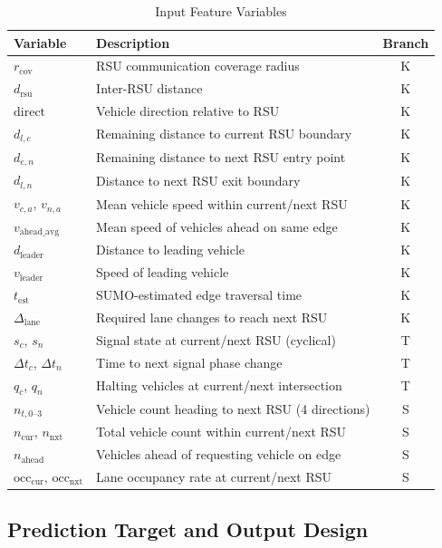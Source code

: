 \documentclass[journal]{IEEEtran}
\begin{document}
\begin{table}[!t]
\centering
\caption{Input Feature Variables}
\label{tab:features}
\begin{tabular}{|l|L{3.8cm}|c|}
\hline
\textbf{Variable} & \textbf{Description} & \textbf{Branch} \\
\hline\hline
$r_\text{cov}$ & RSU communication coverage radius & K \\
$d_\text{rsu}$ & Inter-RSU distance & K \\
$\text{direct}$ & Vehicle direction relative to RSU & K \\
$d_{l,c}$ & Remaining distance to current RSU boundary & K \\
$d_{e,n}$ & Remaining distance to next RSU entry point & K \\
$d_{l,n}$ & Distance to next RSU exit boundary & K \\
$v_{c,a}$, $v_{n,a}$ & Mean vehicle speed within current/next RSU & K \\
$v_\text{ahead\_avg}$ & Mean speed of vehicles ahead on same edge & K \\
$d_\text{leader}$ & Distance to leading vehicle & K \\
$v_\text{leader}$ & Speed of leading vehicle & K \\
$t_\text{est}$ & SUMO-estimated edge traversal time & K \\
$\Delta_\text{lane}$ & Required lane changes to reach next RSU & K \\
\hline
$s_{c}$, $s_{n}$ & Signal state at current/next RSU (cyclical) & T \\
$\Delta t_{c}$, $\Delta t_{n}$ & Time to next signal phase change & T \\
$q_{c}$, $q_{n}$ & Halting vehicles at current/next intersection & T \\
\hline
$n_{t,0\text{--}3}$ & Vehicle count heading to next RSU (4 directions) & S \\
$n_\text{cur}$, $n_\text{nxt}$ & Total vehicle count within current/next RSU & S \\
$n_\text{ahead}$ & Vehicles ahead of requesting vehicle on edge & S \\
$\text{occ}_\text{cur}$, $\text{occ}_\text{nxt}$ & Lane occupancy rate at current/next RSU & S \\
\hline
\end{tabular}
\end{table}

\subsection{Prediction Target and Output Design}
\end{document}

